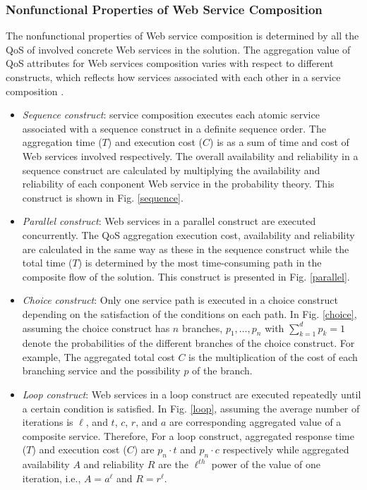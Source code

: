 \subsubsection{Nonfunctional Properties of Web Service Composition}
The nonfunctional properties of Web service composition is determined by all the QoS of involved concrete Web services in the solution. The aggregation value of QoS attributes for Web services composition varies with respect to different constructs, which reflects how services associated with each other in a service composition \cite{zeng2003quality}.
\begin{itemize}

\item \emph{Sequence construct}: service composition executes each atomic service associated with a sequence construct in a definite sequence order. The aggregation time ($T$) and execution cost ($C$) is as a sum of time and cost of Web services involved respectively. The overall availability and reliability in a sequence construct are calculated by multiplying the availability and reliability of each conponent Web service in the probability theory. This construct is shown in Fig. \ref{sequence}.
\item \emph{Parallel construct}: Web services in a parallel construct are executed concurrently. The QoS aggregation execution cost, availability and reliability are calculated in the same way as these in the sequence construct while the total time ($T$) is determined by the most time-consuming path in the composite flow of the solution. This construct is presented in Fig. \ref{parallel}.
\item \emph{Choice construct}: Only one service path is executed in a choice construct depending on the satisfaction of the conditions on each path. In Fig. \ref{choice}, assuming the choice construct has $n$ branches, $p_1,\ldots, p_n$ with  $\sum\limits^d_{k=1}p_k=1$ denote the probabilities of the different branches of the choice construct. For example, The aggregated total cost $C$  is the multiplication of the cost of each branching service and the possibility $p$ of the branch.
\item \emph{Loop construct}: Web services in a loop construct are executed repeatedly until a certain condition is satisfied. In Fig. \ref{loop}, assuming the average number of iterations is $\ell$, and $t$, $c$, $r$, and $a$ are corresponding aggregated value of a composite service. Therefore, For a loop construct, aggregated response time ($T$) and execution cost ($C$) are $p_n \cdot t$ and $p_n \cdot c$ respectively while aggregated availability $A$ and reliability $R$ are the $\ell^{th}$ power of the value of one iteration, i.e., $A=a^\ell$ and $R=r^\ell$.
\end{itemize}


